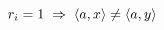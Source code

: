 \documentclass[preview]{standalone}
\begin{document}
\begin{center}
$r_i=1 \hspace{0.1cm}\Rightarrow\hspace{0.1cm} \langle a, x\rangle \neq \langle a,y \rangle$
\end{center}
\end{document}

